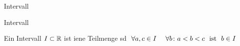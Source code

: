 \documentclass[class=article, crop=false]{standalone}
\begin{document}
\begin{zettel}{Intervall}
\begin{flashcard}[rh4eldj3]{Intervall}
	\begin{definition}
		Ein Intervall $I \subset \mathbb{R} $ ist iene Teilmenge sd $\forall  a , c \in  I \quad \forall  b \colon a <  b <  c \tx{ ist } b \in  I$

	\end{definition}

\end{flashcard}
\end{zettel}
\end{document}
